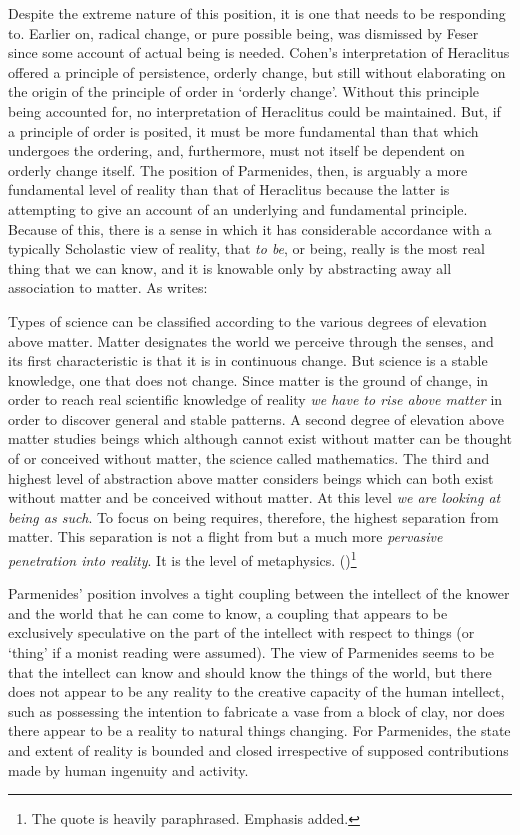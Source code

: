 Despite the extreme nature of this position, it is one that needs to be responding to. Earlier on, radical change, or pure possible being, was dismissed by Feser since some account of actual being is needed. Cohen's interpretation of Heraclitus offered a principle of persistence, orderly change, but still without elaborating on the origin of the principle of order in `orderly change'. Without this principle being accounted for, no interpretation of Heraclitus could be maintained. But, if a principle of order is posited, it must be more fundamental than that which undergoes the ordering, and, furthermore, must not itself be dependent on orderly change itself. The position of Parmenides, then, is arguably a more fundamental level of reality than that of Heraclitus because the latter is attempting to give an account of an underlying and fundamental principle. Because of this, there is a sense in which it has considerable accordance with a typically Scholastic view of reality, that \emph{to be}, or being, really is the most real thing that we can know, and it is knowable only by abstracting away all association to matter. As \citeauthor[][]{de1981christian} writes:
\begin{quoting}
Types of science can be classified according to the various degrees of elevation above matter. Matter designates the world we perceive through the senses, and its first characteristic is that it is in continuous change. But science is a stable knowledge, one that does not change. Since matter is the ground of change, in order to reach real scientific knowledge of reality \emph{we have to rise above matter} in order to discover general and stable patterns. A second degree of elevation above matter studies beings which although cannot exist without matter can be thought of or conceived without matter, the science called mathematics. The third and highest level of abstraction above matter considers beings which can both exist without matter and be conceived without matter. At this level \emph{we are looking at being as such}. To focus on being requires, therefore, the highest separation from matter. This separation is not a flight from but a much more \emph{pervasive penetration into reality}. It is the level of metaphysics.
(\citeyear[][44-45]{de1981christian})\footnote{The quote is heavily paraphrased. Emphasis added.}
\end{quoting}

Parmenides' position involves a tight coupling between the intellect of the knower and the world that he can come to know, a coupling that appears to be exclusively speculative on the part of the intellect with respect to things (or `thing' if a monist reading were assumed). The view of Parmenides seems to be that the intellect can know and should know the things of the world, but there does not appear to be any reality to the creative capacity of the human intellect, such as possessing the intention to fabricate a vase from a block of clay, nor does there appear to be a reality to natural things changing. For Parmenides, the state and extent of reality is bounded and closed irrespective of supposed contributions made by human ingenuity and activity.

